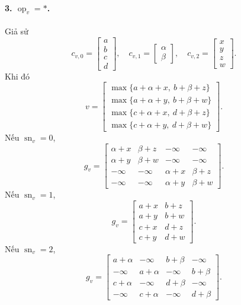\documentclass[11pt]{article}
\begin{document}
\paragraph{3. \(\operatorname{op}_v=\ast\).}
Giả sử
\[
c_{v,0}=\begin{bmatrix}a\\b\\c\\d\end{bmatrix},\quad
c_{v,1}=\begin{bmatrix}\alpha\\\beta\end{bmatrix},\quad
c_{v,2}=\begin{bmatrix}x\\y\\z\\w\end{bmatrix}.
\]
Khi đó
\[
v=
\begin{bmatrix}
\max\{a+\alpha+x,\ b+\beta+z\}\\
\max\{a+\alpha+y,\ b+\beta+w\}\\
\max\{c+\alpha+x,\ d+\beta+z\}\\
\max\{c+\alpha+y,\ d+\beta+w\}
\end{bmatrix}.
\]
Nếu \(\operatorname{sn}_v=0\),
\[
g_v=
\begin{bmatrix}
\alpha+x&\beta+z&-\infty&-\infty\\
\alpha+y&\beta+w&-\infty&-\infty\\
-\infty&-\infty&\alpha+x&\beta+z\\
-\infty&-\infty&\alpha+y&\beta+w
\end{bmatrix}.
\]
Nếu \(\operatorname{sn}_v=1\),
\[
g_v=
\begin{bmatrix}
a+x&b+z\\
a+y&b+w\\
c+x&d+z\\
c+y&d+w
\end{bmatrix}.
\]
Nếu \(\operatorname{sn}_v=2\),
\[
g_v=
\begin{bmatrix}
a+\alpha&-\infty&b+\beta&-\infty\\
-\infty&a+\alpha&-\infty&b+\beta\\
c+\alpha&-\infty&d+\beta&-\infty\\
-\infty&c+\alpha&-\infty&d+\beta
\end{bmatrix}.
\]
\end{document}
